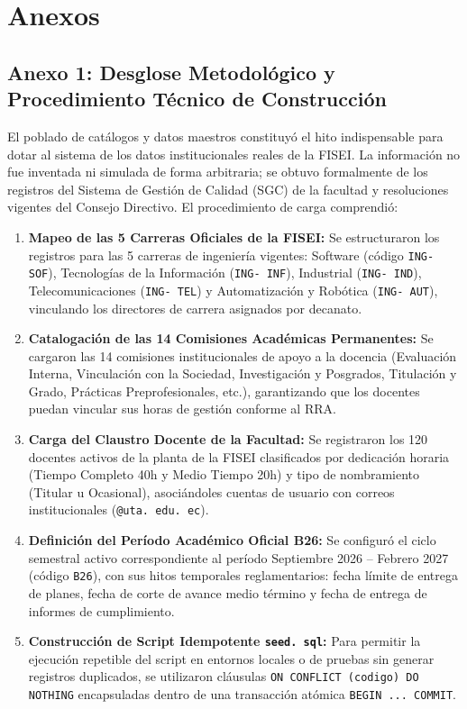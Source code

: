 \documentclass[12pt,a4paper]{article}
\begin{document}
\vspace{0.4cm}

\section{Anexos}

\subsection*{Anexo 1: Desglose Metodológico y Procedimiento Técnico de Construcción}
El poblado de catálogos y datos maestros constituyó el hito indispensable para dotar al sistema de los datos institucionales reales de la FISEI. La información no fue inventada ni simulada de forma arbitraria; se obtuvo formalmente de los registros del Sistema de Gestión de Calidad (SGC) de la facultad y resoluciones vigentes del Consejo Directivo. El procedimiento de carga comprendió:

\begin{enumerate}[leftmargin=1.5em, itemsep=3pt]
    \item \textbf{Mapeo de las 5 Carreras Oficiales de la FISEI:} Se estructuraron los registros para las 5 carreras de ingeniería vigentes: Software (código \texttt{ING- SOF}), Tecnologías de la Información (\texttt{ING- INF}), Industrial (\texttt{ING- IND}), Telecomunicaciones (\texttt{ING- TEL}) y Automatización y Robótica (\texttt{ING- AUT}), vinculando los directores de carrera asignados por decanato.
    \item \textbf{Catalogación de las 14 Comisiones Académicas Permanentes:} Se cargaron las 14 comisiones institucionales de apoyo a la docencia (Evaluación Interna, Vinculación con la Sociedad, Investigación y Posgrados, Titulación y Grado, Prácticas Preprofesionales, etc.), garantizando que los docentes puedan vincular sus horas de gestión conforme al RRA.
    \item \textbf{Carga del Claustro Docente de la Facultad:} Se registraron los 120 docentes activos de la planta de la FISEI clasificados por dedicación horaria (Tiempo Completo 40h y Medio Tiempo 20h) y tipo de nombramiento (Titular u Ocasional), asociándoles cuentas de usuario con correos institucionales (\texttt{@uta. edu. ec}).
    \item \textbf{Definición del Período Académico Oficial B26:} Se configuró el ciclo semestral activo correspondiente al período Septiembre 2026 -- Febrero 2027 (código \texttt{B26}), con sus hitos temporales reglamentarios: fecha límite de entrega de planes, fecha de corte de avance medio término y fecha de entrega de informes de cumplimiento.
    \item \textbf{Construcción de Script Idempotente \texttt{seed. sql}:} Para permitir la ejecución repetible del script en entornos locales o de pruebas sin generar registros duplicados, se utilizaron cláusulas \texttt{ON CONFLICT (codigo) DO NOTHING} encapsuladas dentro de una transacción atómica \texttt{BEGIN ... COMMIT}.
\end{enumerate}
\end{document}
